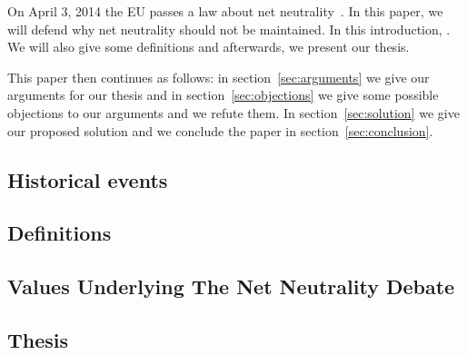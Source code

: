 
On April 3, 2014 the EU passes a law about net neutrality~\cite{whittaker2014eu}. In this paper, we will defend why net neutrality should not be maintained. In this introduction, . We will also give some definitions and afterwards, we present our thesis.

This paper then continues as follows: in section~\ref{sec:arguments} we give our arguments for our thesis and in section~\ref{sec:objections} we give some possible objections to our arguments and we refute them. In section~\ref{sec:solution} we give our proposed solution and we conclude the paper in section~\ref{sec:conclusion}.

\subsection{Historical events}
\label{sec:intro_problem}


\subsection{Definitions}
\label{sec:intro_def}


\subsection{Values Underlying The Net Neutrality Debate}
\label{sec:intro_values}


\subsection{Thesis}
\label{sec:intro_thesis}
